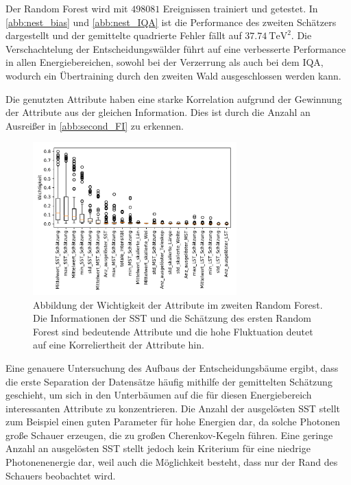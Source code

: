 Der Random Forest wird mit $\num{498081}$ Ereignissen trainiert und getestet.
In \autoref{abb:nest_bias} und \autoref{abb:nest_IQA} ist die Performance des zweiten Schätzers dargestellt und der gemittelte quadrierte Fehler fällt
auf $\SI{37.74}{\tera\eV\squared}$.
Die Verschachtelung der Entscheidungswälder führt auf eine verbesserte Performance in allen Energiebereichen, sowohl bei der Verzerrung als auch bei dem IQA,
wodurch ein Übertraining durch den zweiten Wald ausgeschlossen werden kann.

Die genutzten Attribute haben eine starke Korrelation aufgrund der Gewinnung der Attribute aus der gleichen Information.
Dies ist durch die Anzahl an Ausreißer in \autoref{abb:second_FI} zu erkennen.
\begin{figure}
  \includegraphics[width=0.7\textwidth]{Plots/feautureimportance_boxplot_secondForest.pdf}
  \centering
  \caption{Abbildung der Wichtigkeit der Attribute im zweiten Random Forest. Die Informationen der SST und die
          Schätzung des ersten Random Forest sind bedeutende Attribute und die hohe Fluktuation deutet auf eine
          Korreliertheit der Attribute hin.}
  \label{abb:second_FI}
\end{figure}
Eine genauere Untersuchung des Aufbaus der Entscheidungsbäume ergibt, dass die erste Separation der Datensätze häufig mithilfe der gemittelten Schätzung geschieht,
um sich in den Unterbäumen auf die für diesen Energiebereich interessanten Attribute zu konzentrieren.
Die Anzahl der ausgelösten SST stellt zum Beispiel einen guten Parameter für hohe Energien dar, da solche Photonen große Schauer erzeugen, die
zu großen Cherenkov-Kegeln führen.
Eine geringe Anzahl an ausgelösten SST stellt jedoch kein Kriterium für eine niedrige Photonenenergie dar, weil auch die Möglichkeit besteht, dass nur der
Rand des Schauers beobachtet wird.

